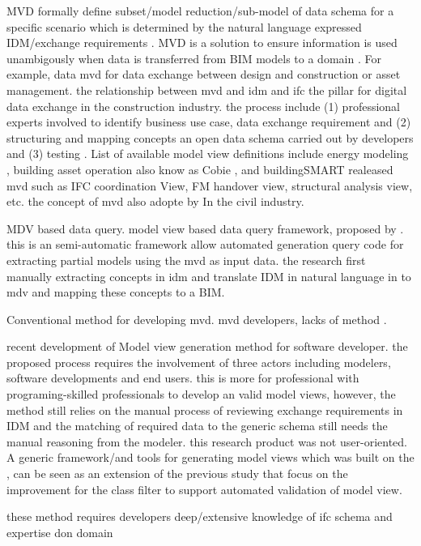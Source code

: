 \documentclass[Journal, InsideFigs, DoubleSpace]{ascelike} %
\begin{document}
MVD formally define subset/model reduction/sub-model of data schema for a specific scenario which is determined by the natural language expressed IDM/exchange requirements . MVD is a solution to ensure information is used unambigously when data is transferred from BIM models to a domain \cite{Jiang15}. For example, data mvd for data exchange between design and construction or asset management. the relationship between mvd and idm and ifc the pillar for digital data exchange in the construction industry. the process include (1) professional experts involved to identify business use case, data exchange requirement and (2) structuring and mapping concepts an open data schema carried out by developers and (3) testing \cite{venugopal12}. List of available model view definitions include energy modeling \cite{Jeong14}, building asset operation also know as Cobie \cite{east12,east07}, and buildingSMART  realeased mvd such as IFC coordination View, FM handover view, structural analysis view, etc. the concept of mvd also adopte by In the civil industry. 

MDV based data query.  model view based data query framework, proposed by \cite{jiang15}. this is an semi-automatic framework allow automated generation query code for extracting partial models using the mvd as input data. the research first manually extracting concepts in idm and translate IDM in natural language in to mdv and mapping these concepts to a BIM.

Conventional method for developing mvd. mvd developers, lacks of method \cite{zhang13}.

recent development of Model view generation method \cite{katranuschkov10} for software developer. the proposed process requires the involvement of three actors including modelers, software developments and end users. this is more for professional with programing-skilled professionals to develop an valid model views, however, the method still relies on the manual process of reviewing exchange requirements in IDM and the matching of required data to the generic schema still needs the manual reasoning from the modeler. this research product was not user-oriented. A generic framework/and tools for generating model views \cite{windisch12} which was built on the \cite{katranuschkov10}, can be seen as an extension of the previous study that focus on the improvement for the class filter to support automated validation of model view. 

these method requires developers deep/extensive knowledge of ifc schema and expertise don domain 
\end{document}
